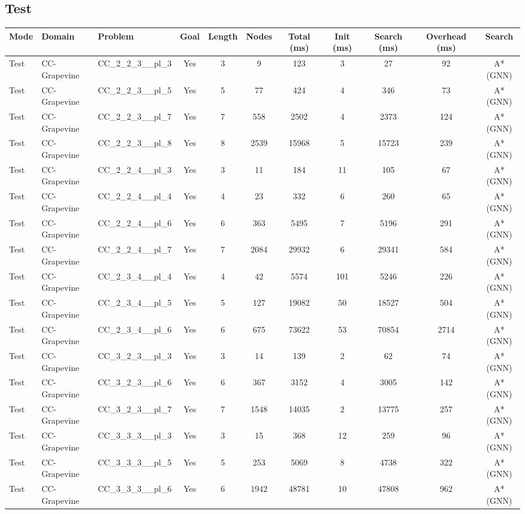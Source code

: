 \documentclass{article}
\begin{document}
\subsection*{Test}
\begin{tabular}{lllcccccccc}
\toprule
Mode & Domain & Problem & Goal & Length & Nodes & Total (ms) & Init (ms) & Search (ms) & Overhead (ms) & Search \\
\midrule
Test & CC-Grapevine & CC\_2\_2\_3\_\_pl\_3 & Yes & 3 & 9 & 123 & 3 & 27 & 92 & A*(GNN) \\
Test & CC-Grapevine & CC\_2\_2\_3\_\_pl\_5 & Yes & 5 & 77 & 424 & 4 & 346 & 73 & A*(GNN) \\
Test & CC-Grapevine & CC\_2\_2\_3\_\_pl\_7 & Yes & 7 & 558 & 2502 & 4 & 2373 & 124 & A*(GNN) \\
Test & CC-Grapevine & CC\_2\_2\_3\_\_pl\_8 & Yes & 8 & 2539 & 15968 & 5 & 15723 & 239 & A*(GNN) \\
Test & CC-Grapevine & CC\_2\_2\_4\_\_pl\_3 & Yes & 3 & 11 & 184 & 11 & 105 & 67 & A*(GNN) \\
Test & CC-Grapevine & CC\_2\_2\_4\_\_pl\_4 & Yes & 4 & 23 & 332 & 6 & 260 & 65 & A*(GNN) \\
Test & CC-Grapevine & CC\_2\_2\_4\_\_pl\_6 & Yes & 6 & 363 & 5495 & 7 & 5196 & 291 & A*(GNN) \\
Test & CC-Grapevine & CC\_2\_2\_4\_\_pl\_7 & Yes & 7 & 2084 & 29932 & 6 & 29341 & 584 & A*(GNN) \\
Test & CC-Grapevine & CC\_2\_3\_4\_\_pl\_4 & Yes & 4 & 42 & 5574 & 101 & 5246 & 226 & A*(GNN) \\
Test & CC-Grapevine & CC\_2\_3\_4\_\_pl\_5 & Yes & 5 & 127 & 19082 & 50 & 18527 & 504 & A*(GNN) \\
Test & CC-Grapevine & CC\_2\_3\_4\_\_pl\_6 & Yes & 6 & 675 & 73622 & 53 & 70854 & 2714 & A*(GNN) \\
Test & CC-Grapevine & CC\_3\_2\_3\_\_pl\_3 & Yes & 3 & 14 & 139 & 2 & 62 & 74 & A*(GNN) \\
Test & CC-Grapevine & CC\_3\_2\_3\_\_pl\_6 & Yes & 6 & 367 & 3152 & 4 & 3005 & 142 & A*(GNN) \\
Test & CC-Grapevine & CC\_3\_2\_3\_\_pl\_7 & Yes & 7 & 1548 & 14035 & 2 & 13775 & 257 & A*(GNN) \\
Test & CC-Grapevine & CC\_3\_3\_3\_\_pl\_3 & Yes & 3 & 15 & 368 & 12 & 259 & 96 & A*(GNN) \\
Test & CC-Grapevine & CC\_3\_3\_3\_\_pl\_5 & Yes & 5 & 253 & 5069 & 8 & 4738 & 322 & A*(GNN) \\
Test & CC-Grapevine & CC\_3\_3\_3\_\_pl\_6 & Yes & 6 & 1942 & 48781 & 10 & 47808 & 962 & A*(GNN) \\

\end{tabular}
\end{document}
